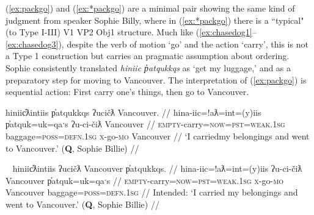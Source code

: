 (\ref{ex:packgo}) and (\ref{ex:*packgo}) are a minimal pair showing the same kind of judgment from speaker Sophie Billy, where in (\ref{ex:*packgo}) there is a ``typical" (to Type I-III) V1 VP2 Obj1 structure. Much like (\ref{ex:chasedog1}--\ref{ex:chasedog3}), despite the verb of motion `go' and the action `carry', this is not a Type 1 construction but carries an pragmatic assumption about ordering. Sophie consistently translated \textit{hiniic p̓atqukkqs} as `get my luggage,' and as a preparatory step for moving to Vancouver. The interpretation of (\ref{ex:packgo}) is sequential action: First carry one's things, then go to Vancouver.

\ex \label{ex:packgo}
\begingl
\glpreamble hiniic̓ƛintiis p̓atqukkqs ʔucičƛ Vancouver. //
\gla hina-iic=!aƛ=int=(y)iis p̓atquk=uk=qaˑs ʔu-ci-čiƛ Vancouver //
\glb \textsc{empty}-carry=\textsc{now}=\textsc{pst}=\textsc{weak.1sg} baggage=\textsc{poss}=\textsc{defn.1sg} \textsc{x}-go-\textsc{mo} Vancouver //
\glft `I carried\footnotemark my belongings and went to Vancouver.' (\textbf{Q}, Sophie Billie) //
\endgl
\xe


\ex~ \label{ex:*packgo}
\begingl
\glpreamble *hiniic̓ƛintiis ʔucičƛ Vancouver p̓atqukkqs. //
\gla hina-iic=!aƛ=int=(y)iis ʔu-ci-čiƛ Vancouver p̓atquk=uk=qaˑs //
\glb \textsc{empty}-carry=\textsc{now}=\textsc{pst}=\textsc{weak.1sg} \textsc{x}-go-\textsc{mo} Vancouver baggage=\textsc{poss}=\textsc{defn.1sg} //
\glft Intended: `I carried my belongings and went to Vancouver.' (\textbf{Q}, Sophie Billie) //
\endgl
\xe


\begin{comment}
actions performed while changing locations (e.g., carry + go as in \ref{ex:carryluggage}),

\ex~ \label{ex:carryluggage}
\begingl
\glpreamble hiniic̓aƛna p̓atquk ʔucačiƛ Qualicum. //
\gla hina-iic=!aƛ=naˑ p̓atquk ʔu-ca-čiƛ Qualicum //
\glb \textsc{empty}-carry=\textsc{now}=\textsc{strg.1pl} belongings \textsc{x}-go.to-\textsc{mo} Qualicum //
\glft `We are taking our belongings going to Qualicum.' (\textbf{C}, \textit{tupaat} Julia Lucas) //
\endgl
\xe 
\end{comment}


